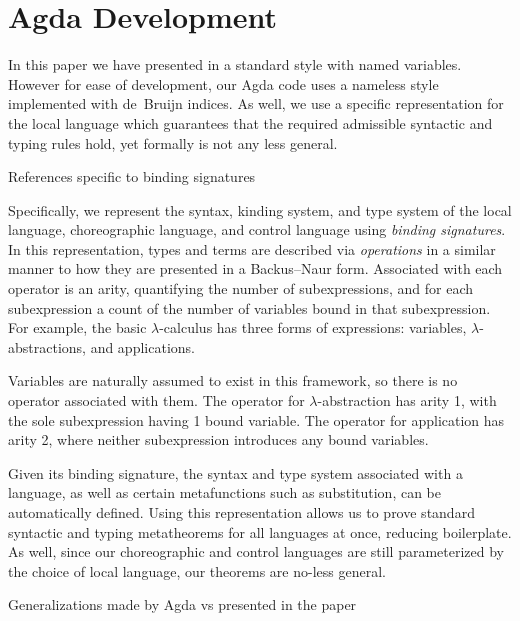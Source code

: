 \section{Agda Development}
\label{sec:agda-dev}

In this paper we have presented \langname in a standard style with named variables.
However for ease of development, our Agda code uses a nameless style implemented with de~Bruijn indices.
As well, we use a specific representation for the local language which guarantees that the required admissible syntactic and typing rules hold, yet formally is not any less general.

\todo References specific to binding signatures

Specifically, we represent the syntax, kinding system, and type system of the local language, choreographic language, and control language using \emph{binding signatures}.
In this representation, types and terms are described via \emph{operations} in a similar manner to how they are presented in a Backus–Naur form.
Associated with each operator is an arity, quantifying the number of subexpressions, and for each subexpression a count of the number of variables bound in that subexpression.
For example, the basic $\lambda$-calculus has three forms of expressions: variables, $\lambda$-abstractions, and applications.
\begin{syntax}
\end{syntax}
Variables are naturally assumed to exist in this framework, so there is no operator associated with them.
The operator for $\lambda$-abstraction has arity 1, with the sole subexpression having 1 bound variable.
The operator for application has arity 2, where neither subexpression introduces any bound variables.

Given its binding signature, the syntax and type system associated with a language, as well as certain metafunctions such as substitution, can be automatically defined.
Using this representation allows us to prove standard syntactic and typing metatheorems for all languages at once, reducing boilerplate.
As well, since our choreographic and control languages are still parameterized by the choice of local language, our theorems are no-less general.

\todo Generalizations made by Agda vs presented in the paper

